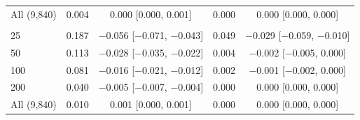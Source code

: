 \begin{tabular}{lcccc}
All (9{,}840) & 0.004 & 0.000 [0.000, 0.001] & 0.000 & 0.000 [0.000, 0.000] \\
\addlinespace
\multicolumn{5}{@{}l}{\textit{Heart, XGBoost}} \\
25 & 0.187 & $-$0.056 [$-$0.071, $-$0.043] & 0.049 & $-$0.029 [$-$0.059, $-$0.010] \\
50 & 0.113 & $-$0.028 [$-$0.035, $-$0.022] & 0.004 & $-$0.002 [$-$0.005, 0.000] \\
100 & 0.081 & $-$0.016 [$-$0.021, $-$0.012] & 0.002 & $-$0.001 [$-$0.002, 0.000] \\
200 & 0.040 & $-$0.005 [$-$0.007, $-$0.004] & 0.000 & 0.000 [0.000, 0.000] \\
All (9{,}840) & 0.010 & 0.001 [0.000, 0.001] & 0.000 & 0.000 [0.000, 0.000] \\
\bottomrule
\end{tabular}
